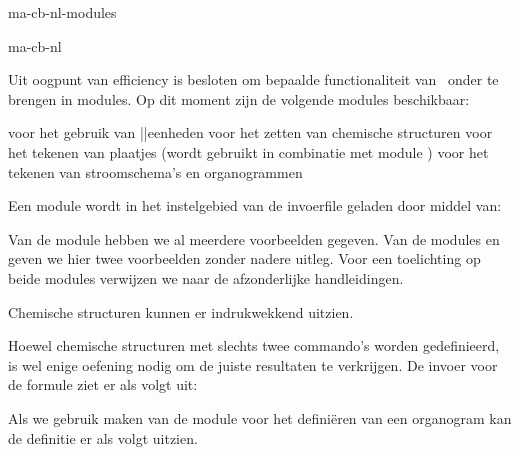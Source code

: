 \startonderdeel ma-cb-nl-modules

\produkt ma-cb-nl




Uit oogpunt van efficiency is besloten om bepaalde
functionaliteit van \CONTEXT\ onder te brengen in modules.
Op dit moment zijn de volgende modules beschikbaar:

\startopsomming[opelkaar]
\som {} voor het gebruik van ||eenheden
\som {} voor het zetten van chemische structuren
\som {} voor het tekenen van plaatjes (wordt
      gebruikt in combinatie met module )
\som {} voor het tekenen van stroomschema's en
     organogrammen
\stopopsomming

Een module wordt in het instelgebied van de invoerfile
geladen door middel van:


Van de module  hebben we al meerdere voorbeelden
gegeven. Van de modules  en  geven
we hier twee voorbeelden zonder nadere uitleg. Voor een
toelichting op beide modules verwijzen we naar de
afzonderlijke handleidingen.

Chemische structuren kunnen er indrukwekkend uitzien.

\startbuffer
\plaatsformule[-]
\startformule
\startchemie[schaal=klein,breedte=passend,boven=3000,onder=3000]
  \chemie[SIX,SB2356,DB14,Z2346,SR3,RZ3,-SR6,+SR6,-RZ6,+RZ6]
         [C,N,C,C,H,H,H]
  \chemie[SR24,RZ24][CH_3,H_3C]
\stopchemie
\stopformule
\stopbuffer

\haalbuffer

Hoewel chemische structuren met slechts twee commando's
worden gedefinieerd, is wel enige oefening nodig om de
juiste resultaten te verkrijgen. De invoer voor de formule
ziet er als volgt uit:

\typebuffer

Als we gebruik maken van de module  voor het
defini\"eren van een organogram kan de definitie er als
volgt uitzien.


